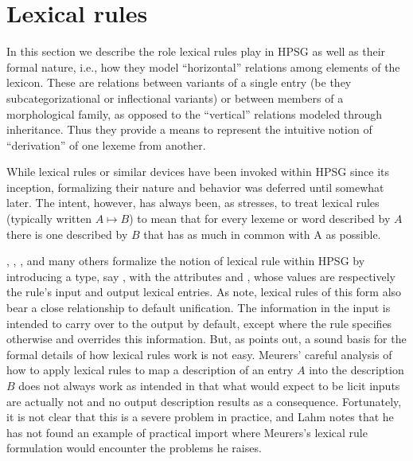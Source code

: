 \documentclass[output=paper]{langsci/langscibook}
\begin{document}
\section{Lexical rules}
\label{lexicon-sec-lexical-rules}

In this section we describe the role lexical rules play in HPSG as well as their formal nature, i.e., how they model ``horizontal'' relations among elements of the lexicon. These are relations between variants of a single entry (be they subcategorizational or inflectional variants) or between members of a morphological family, as opposed to the ``vertical'' relations modeled through inheritance. Thus they provide a means to represent the intuitive notion of ``derivation'' of one lexeme from another. 

While lexical rules or similar devices have been invoked within HPSG since its inception, formalizing their nature and behavior was deferred until somewhat later. 
The intent, however, has always been, as \citet{Lahm2016} stresses, to treat lexical rules (typically written $A \mapsto B$) to mean that for every lexeme or word described by $A$ there is one described by $B$ that has as much in common with A as possible.

\citet{CopestakeandBriscoe1991}, \citet{BriscoeandCopestake1999}, \citet{Meurers2001}, and many others formalize the notion of lexical rule within HPSG by introducing a type, say , with the attributes  and , whose values are respectively the rule's input and output lexical entries. As \citet{BriscoeandCopestake1999} note, lexical rules of this form also bear a close relationship to default unification.
The information in the input is intended to carry over to the output by default, except where the rule specifies otherwise and overrides this information. But, as \citet{Lahm2016} points out, a sound basis for the formal details of how lexical rules work is not easy. Meurers' careful analysis of how to apply lexical rules to map a description of an entry $A$ into the description $B$ does not always work as intended in that what would expect to be licit inputs are actually not and no output description results as a consequence. Fortunately,  it is not clear that this is a severe problem in practice, and Lahm notes that he has not found an example of practical import where Meurers's lexical rule formulation would encounter the problems he raises.
\end{document}
